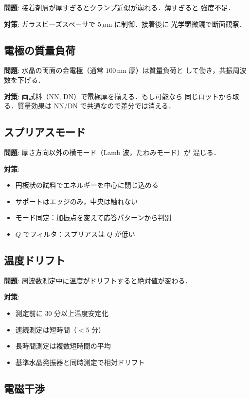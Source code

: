 \documentclass[11pt,a4paper]{article}
\begin{document}
\textbf{問題}: 接着剤層が厚すぎるとクランプ近似が崩れる．薄すぎると
強度不足．

\textbf{対策}: ガラスビーズスペーサで $5\,\mu$m に制御．接着後に
光学顕微鏡で断面観察．

\subsection{電極の質量負荷}

\textbf{問題}: 水晶の両面の金電極（通常 $100$\,nm 厚）は質量負荷と
して働き，共振周波数を下げる．

\textbf{対策}: 両試料（NN, DN）で電極厚を揃える．もし可能なら
同じロットから取る．質量効果は NN/DN で共通なので差分では消える．

\subsection{スプリアスモード}

\textbf{問題}: 厚さ方向以外の横モード（Lamb 波，たわみモード）が
混じる．

\textbf{対策}:
\begin{itemize}
\item 円板状の試料でエネルギーを中心に閉じ込める
\item サポートはエッジのみ，中央は触れない
\item モード同定：加振点を変えて応答パターンから判別
\item $Q$ でフィルタ：スプリアスは $Q$ が低い
\end{itemize}

\subsection{温度ドリフト}

\textbf{問題}: 周波数測定中に温度がドリフトすると絶対値が変わる．

\textbf{対策}:
\begin{itemize}
\item 測定前に 30 分以上温度安定化
\item 連続測定は短時間（$<$5 分）
\item 長時間測定は複数短時間の平均
\item 基準水晶発振器と同時測定で相対ドリフト
\end{itemize}

\subsection{電磁干渉}
\end{document}
